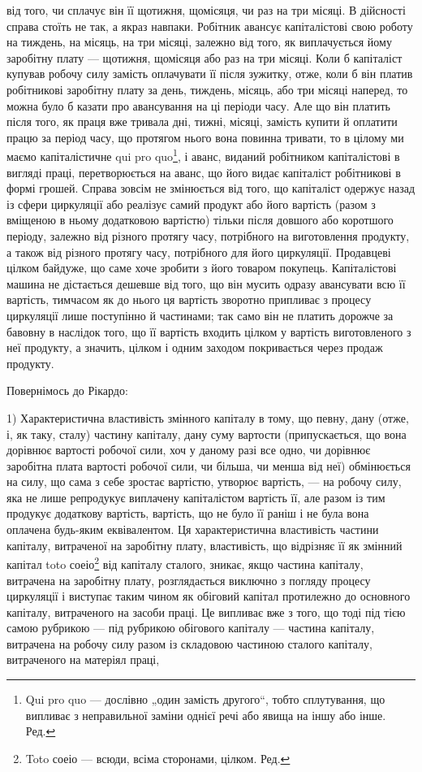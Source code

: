 від того, чи сплачує він її щотижня, щомісяця, чи раз на три місяці.
В дійсності справа стоїть не так, а якраз навпаки. Робітник авансує
капіталістові свою роботу на тиждень, на місяць, на три місяці, залежно
від того, як виплачується йому заробітну плату — щотижня, щомісяця або
раз на три місяці. Коли б капіталіст купував робочу силу замість
оплачувати її після зужитку, отже, коли б він платив робітникові заробітну
плату за день, тиждень, місяць, або три місяці наперед, то можна
було б казати про авансування на ці періоди часу. Але що він платить
після того, як праця вже тривала дні, тижні, місяці, замість купити й
оплатити працю за період часу, що протягом нього вона повинна тривати,
то в цілому ми маємо капіталістичне qui pro quo\footnote*{
Qui pro quo — дослівно „один замість другого“, тобто сплутування, що
випливає з неправильної заміни однієї речі або явища на іншу або інше. Ред.
}, і аванс, виданий
робітником капіталістові в вигляді праці, перетворюється на аванс, що
його видає капіталіст робітникові в формі грошей. Справа зовсім не змінюється
від того, що капіталіст одержує назад із сфери циркуляції або
реалізує самий продукт або його вартість (разом з вміщеною в ньому
додатковою вартістю) тільки після довшого або коротшого періоду, залежно
від різного протягу часу, потрібного на виготовлення продукту,
а також від різного протягу часу, потрібного для його циркуляції. Продавцеві
цілком байдуже, що саме хоче зробити з його товаром покупець.
Капіталістові машина не дістається дешевше від того, що він мусить
одразу авансувати всю її вартість, тимчасом як до нього ця вартість
зворотно припливає з процесу циркуляції лише поступінно й частинами;
так само він не платить дорожче за бавовну в наслідок того, що її
вартість входить цілком у вартість виготовленого з неї продукту, а
значить, цілком і одним заходом покривається через продаж продукту.

Повернімось до Рікардо:

1) Характеристична властивість змінного капіталу в тому, що певну,
дану (отже, і, як таку, сталу) частину капіталу, дану суму вартости
(припускається, що вона дорівнює вартості робочої сили, хоч у даному
разі все одно, чи дорівнює заробітна плата вартості робочої сили, чи
більша, чи менша від неї) обмінюється на силу, що сама з себе
зростає вартістю, утворює вартість, — на робочу силу, яка не лише репродукує
виплачену капіталістом вартість її, але разом із тим продукує
додаткову вартість, вартість, що не було її раніш і не була вона
оплачена будь-яким еквівалентом. Ця характеристична властивість частини
капіталу, витраченої на заробітну плату, властивість, що відрізняє її як
змінний капітал toto соеіо\footnote*{
Toto соеіо — всюди, всіма сторонами, цілком. Ред.
} від капіталу сталого, зникає, якщо частина
капіталу, витрачена на заробітну плату, розглядається виключно з погляду
процесу циркуляції і виступає таким чином як обіговий капітал
протилежно до основного капіталу, витраченого на засоби праці. Це
випливає вже з того, що тоді під тією самою рубрикою — під рубрикою
обігового капіталу — частина капіталу, витрачена на робочу силу разом із
складовою частиною сталого капіталу, витраченого на матеріял праці,